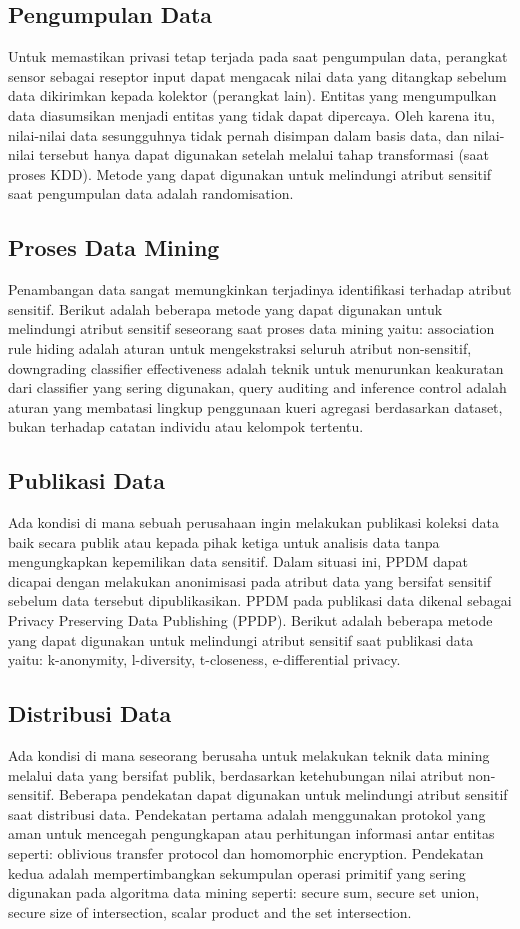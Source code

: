 \subsection{Pengumpulan Data} 
Untuk memastikan privasi tetap terjada pada saat pengumpulan data, perangkat sensor sebagai reseptor input dapat mengacak nilai data yang ditangkap sebelum data dikirimkan kepada kolektor (perangkat lain). Entitas yang mengumpulkan data diasumsikan menjadi entitas yang tidak dapat dipercaya. Oleh karena itu, nilai-nilai data sesungguhnya tidak pernah disimpan dalam basis data, dan nilai-nilai tersebut hanya dapat digunakan setelah melalui tahap transformasi (saat proses KDD). Metode yang dapat digunakan untuk melindungi atribut sensitif saat pengumpulan data adalah randomisation.

\subsection{Proses Data Mining} 
Penambangan data sangat memungkinkan terjadinya identifikasi terhadap atribut sensitif. Berikut adalah beberapa metode yang dapat digunakan untuk melindungi atribut sensitif seseorang saat proses data mining yaitu: association rule hiding adalah aturan untuk mengekstraksi seluruh atribut non-sensitif, downgrading classifier effectiveness adalah teknik untuk menurunkan keakuratan dari classifier yang sering digunakan, query auditing and inference control adalah aturan yang membatasi lingkup penggunaan kueri agregasi berdasarkan dataset, bukan terhadap catatan individu atau kelompok tertentu.

\subsection{Publikasi Data} 
Ada kondisi di mana sebuah perusahaan ingin melakukan publikasi koleksi data baik secara publik atau kepada pihak ketiga untuk analisis data tanpa mengungkapkan kepemilikan data sensitif. Dalam situasi ini, PPDM dapat dicapai dengan melakukan anonimisasi pada atribut data yang bersifat sensitif sebelum data tersebut dipublikasikan. PPDM pada publikasi data dikenal sebagai Privacy Preserving Data Publishing (PPDP). Berikut adalah beberapa metode yang dapat digunakan untuk melindungi atribut sensitif saat publikasi data yaitu: k-anonymity, l-diversity, t-closeness, e-differential privacy.

\subsection{Distribusi Data} 
Ada kondisi di mana seseorang berusaha untuk melakukan teknik data mining melalui data yang bersifat publik, berdasarkan ketehubungan nilai atribut non-sensitif. Beberapa pendekatan dapat digunakan untuk melindungi atribut sensitif saat distribusi data. Pendekatan pertama adalah menggunakan protokol yang aman untuk mencegah pengungkapan atau perhitungan informasi antar entitas seperti: oblivious transfer protocol dan homomorphic encryption.  Pendekatan kedua adalah mempertimbangkan sekumpulan operasi primitif yang sering digunakan pada algoritma data mining seperti: secure sum, secure set union, secure size of intersection, scalar product and the set intersection.

